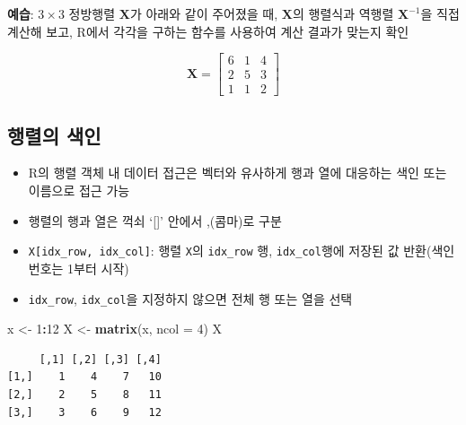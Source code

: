 \documentclass[
  11pt,
]{krantz}
\makeatletter
\newenvironment{Shaded}{\begin{snugshade}}{\end{snugshade}}
\newcommand{\DataTypeTok}[1]{\textcolor[rgb]{0.27,0.27,0.27}{#1}}
\newcommand{\DecValTok}[1]{\textcolor[rgb]{0.06,0.06,0.06}{#1}}
\newcommand{\KeywordTok}[1]{\textcolor[rgb]{0.27,0.27,0.27}{\textbf{#1}}}
\newcommand{\NormalTok}[1]{#1}
\newcommand{\OperatorTok}[1]{\textcolor[rgb]{0.43,0.43,0.43}{\textbf{#1}}}
\newcommand{\StringTok}[1]{\textcolor[rgb]{0.5,0.5,0.5}{#1}}
\providecommand{\tightlist}{%
  \setlength{\itemsep}{0pt}\setlength{\parskip}{0pt}}
\newenvironment{kframe}{%
\medskip{}
\setlength{\fboxsep}{.8em}
 \def\at@end@of@kframe{}%
 \ifinner\ifhmode%
  \def\at@end@of@kframe{\end{minipage}}%
  \begin{minipage}{\columnwidth}%
 \fi\fi%
 \def\FrameCommand##1{\hskip\@totalleftmargin \hskip-\fboxsep
 \colorbox{shadecolor}{##1}\hskip-\fboxsep
     \hskip-\linewidth \hskip-\@totalleftmargin \hskip\columnwidth}%
 \MakeFramed {\advance\hsize-\width
   \@totalleftmargin\z@ \linewidth\hsize
   \@setminipage}}%
 {\par\unskip\endMakeFramed%
 \at@end@of@kframe}
\newenvironment{rmdblock}[1]
  {
  \begin{itemize}
  \renewcommand{\labelitemi}{
    \raisebox{-.7\height}[0pt][0pt]{
      {\setkeys{Gin}{width=3em,keepaspectratio}\texttt{[image: images/\#1]}}
    }
  }
  \setlength{\fboxsep}{1em}
  \begin{kframe}
  \item
  }
  {
  \end{kframe}
  \end{itemize}
  }
\newenvironment{rmdimportant}
  {\begin{rmdblock}{important}}
  {\end{rmdblock}}
\makeatother
\begin{document}
\normalsize

\footnotesize

\begin{rmdimportant}
\begin{rmdimportant}

\textbf{예습}: \(3\times 3\) 정방행렬 \(\mathrm{\mathbf{X}}\)가 아래와 같이 주어졌을 때, \(\mathrm{\mathbf{X}}\)의 행렬식과 역행렬 \(\mathrm{\mathbf{X}}^{-1}\)을 직접 계산해 보고, R에서 각각을 구하는 함수를 사용하여 계산 결과가 맞는지 확인

\[\mathrm{\mathbf{X}} = 
\begin{bmatrix}
6 & 1 & 4 \\
2 & 5 & 3 \\
1 & 1 & 2
\end{bmatrix}
\]

\end{rmdimportant}
\end{rmdimportant}

\normalsize

\hypertarget{mat-index}{%
\subsection{행렬의 색인}\label{mat-index}}

\begin{itemize}
\tightlist
\item
  R의 행렬 객체 내 데이터 접근은 벡터와 유사하게 행과 열에 대응하는 색인 또는 이름으로 접근 가능
\item
  행렬의 행과 열은 꺽쇠 `{[}{]}' 안에서 ,(콤마)로 구분
\item
  \texttt{X{[}idx\_row,\ idx\_col{]}}: 행렬 \texttt{X}의 \texttt{idx\_row} 행, \texttt{idx\_col}행에 저장된 값 반환(색인번호는 1부터 시작)
\item
  \texttt{idx\_row}, \texttt{idx\_col}을 지정하지 않으면 전체 행 또는 열을 선택
\end{itemize}

\footnotesize

\begin{Shaded}
\begin{Highlighting}[]
\NormalTok{x <-}\StringTok{ }\DecValTok{1}\OperatorTok{:}\DecValTok{12}
\NormalTok{X <-}\StringTok{ }\KeywordTok{matrix}\NormalTok{(x, }\DataTypeTok{ncol =} \DecValTok{4}\NormalTok{)}
\NormalTok{X}
\end{Highlighting}
\end{Shaded}

\begin{verbatim}
     [,1] [,2] [,3] [,4]
[1,]    1    4    7   10
[2,]    2    5    8   11
[3,]    3    6    9   12
\end{verbatim}
\end{document}
